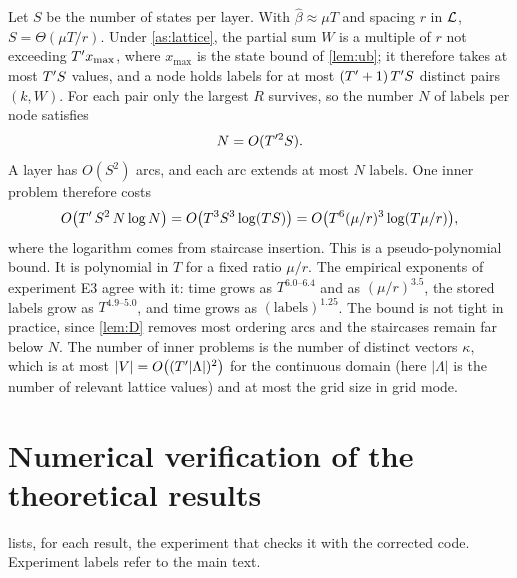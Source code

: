 Let $S$ be the number of states per layer. With $\hat\beta\approx\mu T$ and spacing $r$
in $\mathcal{L}$, $S=\Theta(\mu T/r)$. Under \cref{as:lattice}, the partial sum $W$ is a multiple
of $r$ not exceeding $T' x_{\max}$, where $x_{\max}$ is the state bound of \cref{lem:ub};
it therefore takes at most $T' S$ values, and a node holds labels for at most
$(T'+1)\,T' S$ distinct pairs $(k,W)$. For each pair only the largest $R$ survives, so
the number $N$ of labels per node satisfies
\begin{equation}
  N=O(T'^{2}S).
\end{equation}
A layer has $O(S^2)$ arcs, and each arc extends at most $N$ labels. One inner
problem therefore costs
\begin{equation}\label{eq:complexity}
  O\bigl(T'\,S^{2}\,N\log N\bigr)
  =O\bigl(T^{3}S^{3}\log(TS)\bigr)
  =O\bigl(T^{6}(\mu/r)^{3}\log(T\mu/r)\bigr),
\end{equation}
where the logarithm comes from staircase insertion. This is a pseudo-polynomial bound. It
is polynomial in $T$ for a fixed ratio $\mu/r$. The empirical exponents of experiment E3
agree with it: time grows as $T^{6.0\text{--}6.4}$ and as $(\mu/r)^{3.5}$, the stored
labels grow as $T^{4.9\text{--}5.0}$, and time grows as $(\text{labels})^{1.25}$. The
bound is not tight in practice, since \cref{lem:D} removes most ordering arcs and the
staircases remain far below $N$. The number of inner problems is the number of
distinct vectors $\kappa$, which is at most $\lvert V\rvert=O\bigl((T'\lvert\Lambda\rvert)^2\bigr)$
for the continuous domain (here $\lvert\Lambda\rvert$ is the number of relevant lattice
values) and at most the grid size in grid mode.

\section{Numerical verification of the theoretical results}\label{sec:verification}

 lists, for each result, the experiment that checks it with the
corrected code. Experiment labels refer to the main text.

